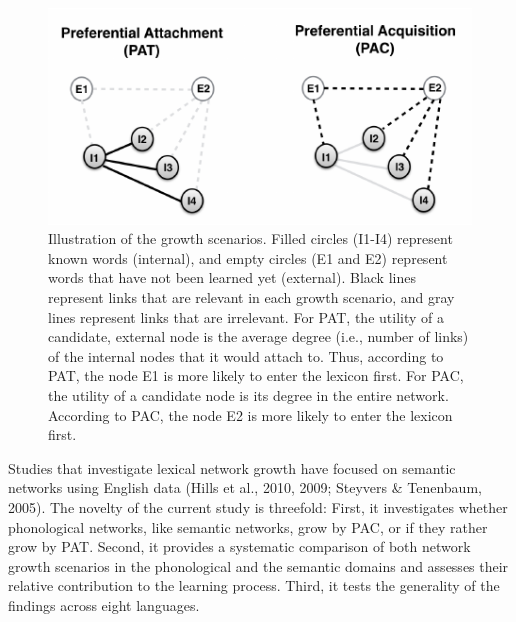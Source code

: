 \documentclass[10pt, letterpaper]{article}
\newenvironment{CodeChunk}{}{}
\begin{document}
\begin{CodeChunk}
\begin{figure}[H]

{\centering \includegraphics{figs/growth-1} 

}

\caption{\label{fig:growth}Illustration of the growth scenarios. Filled circles (I1-I4) represent known words (internal), and empty circles (E1 and E2) represent words that have not been learned yet (external). Black lines represent links that are relevant in each growth scenario, and gray lines represent links that are irrelevant. For PAT, the utility of a candidate, external node is the average degree (i.e., number of links) of the internal nodes that it would attach to. Thus, according to PAT, the node E1 is more likely to enter the lexicon first. For PAC, the utility of a candidate node is its degree in the entire network. According to PAC, the node E2 is more likely to enter the lexicon first.}\label{fig:growth}
\end{figure}
\end{CodeChunk}

Studies that investigate lexical network growth have focused on semantic
networks using English data (Hills et al., 2010, 2009; Steyvers \&
Tenenbaum, 2005). The novelty of the current study is threefold: First,
it investigates whether phonological networks, like semantic networks,
grow by PAC, or if they rather grow by PAT. Second, it provides a
systematic comparison of both network growth scenarios in the
phonological and the semantic domains and assesses their relative
contribution to the learning process. Third, it tests the generality of
the findings across eight languages.
\end{document}
